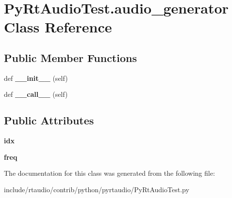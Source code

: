 \hypertarget{class_py_rt_audio_test_1_1audio__generator}{}\section{Py\+Rt\+Audio\+Test.\+audio\+\_\+generator Class Reference}
\label{class_py_rt_audio_test_1_1audio__generator}
\subsection*{Public Member Functions}
\begin{DoxyCompactItemize}
\item 
def {\bfseries \+\_\+\+\_\+init\+\_\+\+\_\+} (self)\hypertarget{class_py_rt_audio_test_1_1audio__generator_a4201b167e67c830ec3daa2cac5c8d625}{}\label{class_py_rt_audio_test_1_1audio__generator_a4201b167e67c830ec3daa2cac5c8d625}

\item 
def {\bfseries \+\_\+\+\_\+call\+\_\+\+\_\+} (self)\hypertarget{class_py_rt_audio_test_1_1audio__generator_a98dbc6c0690fe28a79bc5136bdf27b5a}{}\label{class_py_rt_audio_test_1_1audio__generator_a98dbc6c0690fe28a79bc5136bdf27b5a}

\end{DoxyCompactItemize}
\subsection*{Public Attributes}
\begin{DoxyCompactItemize}
\item 
{\bfseries idx}\hypertarget{class_py_rt_audio_test_1_1audio__generator_a012caf2887cf2e6df335b0b60963a50d}{}\label{class_py_rt_audio_test_1_1audio__generator_a012caf2887cf2e6df335b0b60963a50d}

\item 
{\bfseries freq}\hypertarget{class_py_rt_audio_test_1_1audio__generator_a203626a5081efd2a6a3122cf002b4034}{}\label{class_py_rt_audio_test_1_1audio__generator_a203626a5081efd2a6a3122cf002b4034}

\end{DoxyCompactItemize}


The documentation for this class was generated from the following file\+:\begin{DoxyCompactItemize}
\item 
include/rtaudio/contrib/python/pyrtaudio/Py\+Rt\+Audio\+Test.\+py\end{DoxyCompactItemize}
